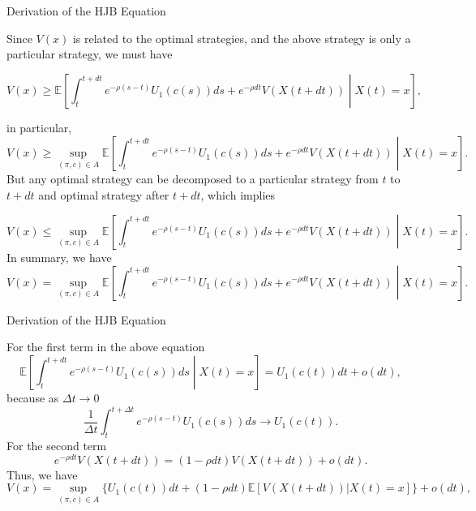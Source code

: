 \documentclass{beamer}
\begin{document}
\begin{frame}{Derivation of the HJB Equation}


    {\footnotesize \footnotesize
     Since \( V(x) \) is related to the optimal strategies, and the above strategy is only a particular strategy, we must have
         {\footnotesize \tiny
        \[
        V(x) \geq \mathbb{E} \left[ \int_{t}^{t+dt} e^{-\rho(s-t)} U_1(c(s)) ds + e^{-\rho dt} V(X(t + dt)) \middle| X(t) = x \right],
        \]

            }
            \par  \pause in particular,
            {\footnotesize \tiny
        \[
        V(x) \geq \sup_{(\pi, c) \in A} \mathbb{E} \left[ \int_{t}^{t+dt} e^{-\rho(s-t)} U_1(c(s)) ds + e^{-\rho dt} V(X(t + dt)) \middle| X(t) = x \right].
        \]
            }
         \pause But any optimal strategy can be decomposed to a particular strategy from \( t \) to \( t + dt \) and optimal strategy after \( t + dt \), which implies

        {\footnotesize \tiny
        \[
        V(x) \leq \sup_{(\pi, c) \in A} \mathbb{E} \left[ \int_{t}^{t+dt} e^{-\rho(s-t)} U_1(c(s)) ds + e^{-\rho dt} V(X(t + dt)) \middle| X(t) = x \right].
        \]
    }
     \pause In summary, we have
{\footnotesize \tiny
        \[
V(x) = \sup_{(\pi, c) \in A} \mathbb{E} \left[ \int_{t}^{t+dt} e^{-\rho(s-t)} U_1(c(s)) ds + e^{-\rho dt} V(X(t + dt)) \middle| X(t) = x \right].
\]
    }
    }
    
\end{frame}

\begin{frame}{Derivation of the HJB Equation}


    {\footnotesize \footnotesize
     For the first term in the above equation
\[
\mathbb{E} \left[ \int_{t}^{t+dt} e^{-\rho(s-t)} U_1(c(s)) ds \middle| X(t) = x \right] = U_1(c(t)) dt + o(dt),
\]
because as \( \Delta t \to 0 \)
\[
\frac{1}{\Delta t} \int_{t}^{t+\Delta t} e^{-\rho(s-t)} U_1(c(s)) ds \to U_1(c(t)).
\]
 \pause For the second term
\[
e^{-\rho dt} V(X(t + dt)) = (1 - \rho dt) V(X(t + dt)) + o(dt).
\]
Thus, we have
\[
V(x) = \sup_{(\pi,c) \in A} \{U_1(c(t))dt + (1 - \rho dt)\mathbb{E}[V(X(t + dt))|X(t) = x]\} + o(dt),
\]
    }
    
\end{frame}
\end{document}
